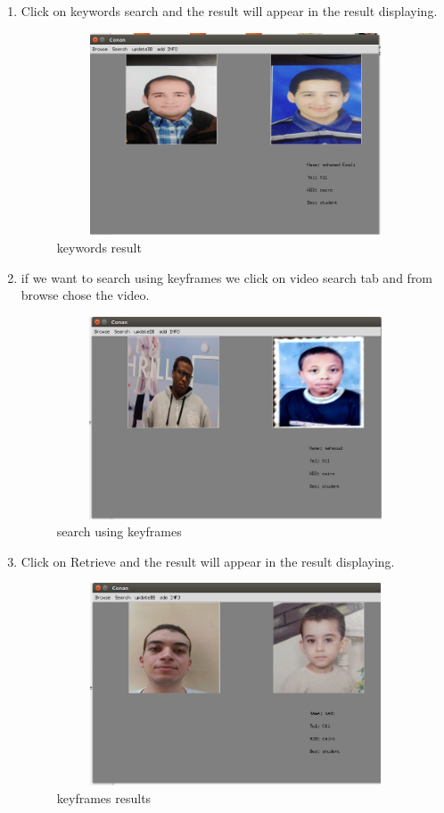 \documentclass[pdftex,10pt,a4paper,oneside]{article}
\begin{document}
\begin{enumerate}
\pagebreak
		\item 	Click on keywords search and the result will appear in the result displaying.
\begin{figure}[H]
	\centering
	\includegraphics[width=120mm,height=60mm]{fig/15.png}
	\caption{keywords result  }
	\label{keywords result }
\end{figure}

		\item if we want to search using keyframes we click on video search tab and from browse chose the video.
				\begin{figure}[H]
			\centering
			\includegraphics[width=120mm,height=60mm]{fig/16.png}
			\caption{search using keyframes }
			\label{search using keyframes}
		\end{figure}
		\pagebreak
				\item 	Click on Retrieve and the result will appear in the result displaying.
						\begin{figure}[H]
					\centering
					\includegraphics[width=120mm,height=60mm]{fig/17.png}
					\caption{keyframes results}
					\label{keyframes results}
				\end{figure}
	\end{enumerate}
\pagebreak
\end{document}
